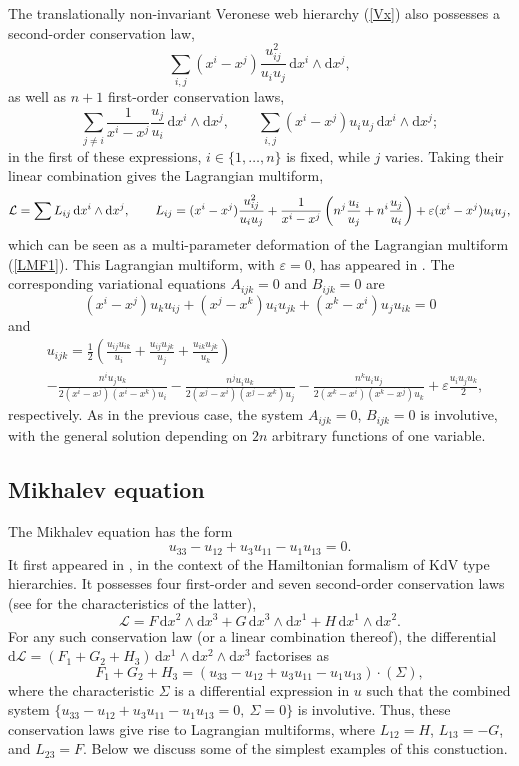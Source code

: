 \documentclass[12pt, a4paper]{article}
\theoremstyle{definition}
\renewcommand{\d}{\mathrm{d}}
\newcommand{\cL}{\mathcal{L}}
\begin{document}
The translationally non-invariant Veronese web hierarchy (\ref{Vx}) also possesses a second-order conservation law,
$$
\sum_{i,j}(x^i-x^j)\frac{u_{ij}^2}{u_iu_j}\, \d x^i\wedge \d x^j,
$$
as well as $n+1$ first-order conservation laws,
$$
\sum_{j\ne i}\frac{1}{x^i-x^j}\frac{u_j}{u_i}\, \d x^i\wedge \d x^j, \qquad \sum_{i, j}(x^i-x^j)u_iu_j\, \d x^i\wedge \d x^j;
$$
in the first of these expressions, $i\in \{1, \dots, n\}$ is fixed, while $j$ varies. Taking their linear combination gives the Lagrangian multiform,
$$
{\cal L}=\sum L_{ij}\, \d x^i\wedge \d x^j, \qquad L_{ij}=(x^i-x^j)\frac{u_{ij}^2}{u_iu_j}+\frac{1}{x^i-x^j}\left(n^j\frac{u_i}{u_j}+n^i\frac{u_j}{u_i} \right)+\varepsilon (x^i-x^j)u_iu_j,
$$
which can be seen as a multi-parameter deformation of the Lagrangian multiform (\ref{LMF1}). This Lagrangian multiform, with $\varepsilon = 0$, has appeared in \cite{lobb2009lagrangian}. The corresponding variational equations $A_{ijk}=0$ and $B_{ijk}=0$ are
\begin{equation*}
(x^i-x^j)u_{k}u_{ij}+(x^j-x^k)u_{i}u_{jk}+(x^k-x^i)u_{j}u_{ik}=0
\end{equation*}
and
\begin{align*}
&u_{ijk} =\frac{1}{2}\left(\frac{u_{ij}u_{ik}}{u_i}+ \frac{u_{ij}u_{jk}}{u_j}+\frac{u_{ik}u_{jk}}{u_k}\right)\\
& - \frac{n^i u_ju_k}{2(x^i-x^j)(x^i-x^k)u_i} - \frac{n^j u_iu_k}{2(x^j-x^i)(x^j-x^k)u_j} -  \frac{n^k u_iu_j}{2(x^k-x^i)(x^k-x^j)u_k} + \varepsilon \frac{u_iu_ju_k}{2},
\end{align*}
respectively. As in the previous case,  the system  $A_{ijk} = 0$, $B_{ijk} = 0$ is involutive, with the general solution depending on $2n$ arbitrary functions of one variable.



\subsection{Mikhalev equation}

The Mikhalev equation has the form
\begin{equation}\label{Mik}
u_{33}-u_{12}+u_3u_{11}-u_1u_{13}=0.
\end{equation}
It first appeared in \cite{mikhalev1992hamiltonian}, 
in the context of the Hamiltonian formalism of KdV type hierarchies. It possesses four first-order and seven second-order conservation laws (see \cite{baran2014higher} for the characteristics of the latter), 
$$
\cL =F\, \d x^2\wedge \d x^3+G\, \d x^3\wedge \d x^1+H\, \d x^1\wedge \d x^2.
$$ 
For any such conservation law (or a linear combination thereof), the differential $\d\cL=(F_1+G_2+H_3)\, \d x^1\wedge \d x^2\wedge \d x^3$  factorises as 
$$
F_1+G_2+H_3=(u_{33}-u_{12}+u_3u_{11}-u_1u_{13})\cdot (\Sigma),
$$
where the characteristic $\Sigma$ is a differential expression in $u$ such that the combined system $\{u_{33}-u_{12}+u_3u_{11}-u_1u_{13}=0,\ \Sigma=0\}$ is involutive. Thus, these conservation laws give rise to Lagrangian multiforms, where $L_{12} = H$, $L_{13} = -G$, and $L_{23} = F$.
Below we discuss some of the simplest examples of this constuction.
\end{document}
